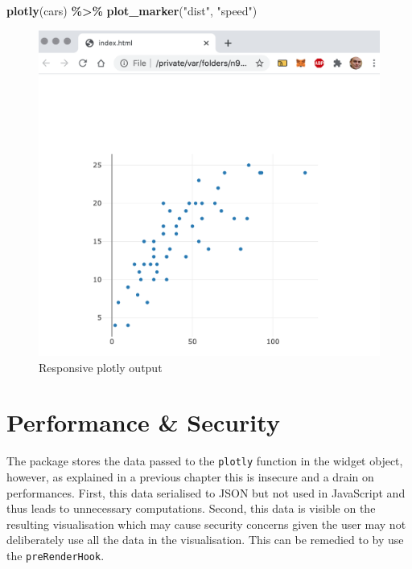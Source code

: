 \documentclass[
]{krantz}
\makeatletter
\newenvironment{Shaded}{\begin{snugshade}}{\end{snugshade}}
\newcommand{\KeywordTok}[1]{\textcolor[rgb]{0.27,0.27,0.27}{\textbf{#1}}}
\newcommand{\NormalTok}[1]{#1}
\newcommand{\OperatorTok}[1]{\textcolor[rgb]{0.43,0.43,0.43}{\textbf{#1}}}
\newcommand{\StringTok}[1]{\textcolor[rgb]{0.5,0.5,0.5}{#1}}
\newenvironment{kframe}{%
\medskip{}
\setlength{\fboxsep}{.8em}
 \def\at@end@of@kframe{}%
 \ifinner\ifhmode%
  \def\at@end@of@kframe{\end{minipage}}%
  \begin{minipage}{\columnwidth}%
 \fi\fi%
 \def\FrameCommand##1{\hskip\@totalleftmargin \hskip-\fboxsep
 \colorbox{shadecolor}{##1}\hskip-\fboxsep
     \hskip-\linewidth \hskip-\@totalleftmargin \hskip\columnwidth}%
 \MakeFramed {\advance\hsize-\width
   \@totalleftmargin\z@ \linewidth\hsize
   \@setminipage}}%
 {\par\unskip\endMakeFramed%
 \at@end@of@kframe}
\renewenvironment{Shaded}{\begin{kframe}}{\end{kframe}}
\makeatother
\begin{document}
\begin{Shaded}
\begin{Highlighting}[]
\KeywordTok{plotly}\NormalTok{(cars) }\OperatorTok{\%\textgreater{}\%}\StringTok{  }
\StringTok{      }\KeywordTok{plot\_marker}\NormalTok{(}\StringTok{"dist"}\NormalTok{, }\StringTok{"speed"}\NormalTok{)}
\end{Highlighting}
\end{Shaded}

\begin{figure}
\centering
\includegraphics{images/plotlier-responsive.png}
\caption{Responsive plotly output}
\end{figure}

\hypertarget{performance-security}{%
\section*{Performance \& Security}\label{performance-security}}


The package stores the data passed to the \texttt{plotly} function in the widget object, however, as explained in a previous chapter this is insecure and a drain on performances. First, this data serialised to JSON but not used in JavaScript and thus leads to unnecessary computations. Second, this data is visible on the resulting visualisation which may cause security concerns given the user may not deliberately use all the data in the visualisation. This can be remedied to by use the \texttt{preRenderHook}.
\end{document}
